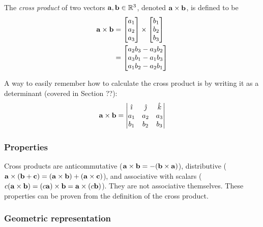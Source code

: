\documentclass[../main.tex]{subfiles}
\begin{document}
\begin{definition}
	The \textit{cross product} of two vectors $\mathbf{a}, \mathbf{b} \in \mathbb{R}^3$,
	denoted $\mathbf{a}\times\mathbf{b}$, is defined to be
	\begin{align*}
		\mathbf{a}\times\mathbf{b} & = \begin{bmatrix}a_1\\a_2\\a_3\end{bmatrix}\times\begin{bmatrix}b_1\\b_2\\b_3\end{bmatrix} \\
		                       & = \begin{bmatrix}a_2b_3-a_3b_2\\a_3b_1-a_1b_3\\a_1b_2-a_2b_1\end{bmatrix}
	\end{align*}
\end{definition}

\begin{remark}
	A way to easily remember how to calculate the cross product is by writing
	it as a determinant (covered in Section ??):
	$$\mathbf{a}\times\mathbf{b}=\begin{vmatrix}
			\hat{\imath} & \hat{\jmath} & \hat{k} \\
			a_1           & a_2           & a_3      \\
			b_1           & b_2           & b_3
		\end{vmatrix}$$
\end{remark}

\subsubsection{Properties}

Cross products are anticommutative ($\mathbf{a}\times\mathbf{b}=-(\mathbf{b}\times\mathbf{a})$),
distributive ($\mathbf{a}\times(\mathbf{b}+\mathbf{c})=(\mathbf{a}\times\mathbf{b})+(\mathbf{a}\times\mathbf{c})$),
and associative with scalars ($c(\mathbf{a}\times\mathbf{b})=(c\mathbf{a})\times\mathbf{b}=\mathbf{a}\times(c\mathbf{b})$).
They are not associative themselves. These properties can be proven from the definition
of the cross product.

\subsubsection{Geometric representation}
\end{document}
